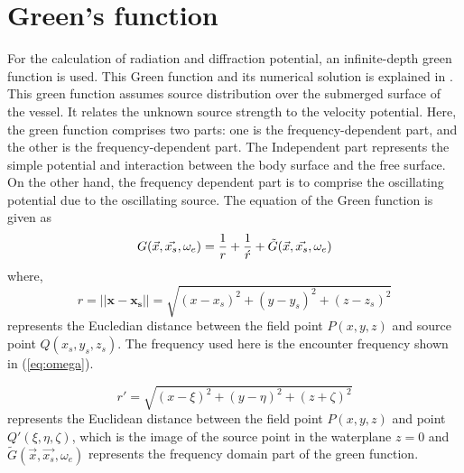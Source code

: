 \section{Green's function}
\label{sec:green_fun}
For the calculation of radiation and diffraction potential, an infinite-depth green function is 
used. This Green function and its numerical solution is explained in \cite{telste1986numerical}. 
This green function assumes source distribution over the submerged surface of the vessel. 
It relates the unknown source strength to the velocity potential. Here, the green function 
comprises two parts: one is the frequency-dependent part, and the other is the 
frequency-dependent part.  The Independent part represents the simple potential 
and interaction between the body surface and the free surface. On the other hand, 
the frequency dependent part is to comprise the oscillating potential due to the 
oscillating source. The equation of the Green function is given as 
\begin{equation}
    \label{eq:green_eq}
    G(\vec{x}, \vec{x_s}, \omega_e) = \frac{1}{r} + \frac{1}{\acute{r}} + \Tilde{G}(\vec{x}, \vec{x_s}, \omega_e) 
\end{equation}
where, 
\begin{equation}
    r = ||\boldsymbol{x} - \boldsymbol{x_s}|| = \sqrt{(x-x_s)^2+(y-y_s)^2+(z-z_s)^2}
\end{equation}
represents the Eucledian distance between the field point $P(x, y, z)$ and source 
point $Q(x_s, y_s, z_s)$. The frequency used here is the encounter frequency shown in 
(\ref{eq:omega}).

\begin{equation}
    r' = \sqrt{(x - \xi)^2 + (y - \eta)^2 + (z + \zeta)^2}   
\end{equation}
represents the Euclidean distance between the field point $P(x, y, z)$ and point 
$Q'(\xi, \eta, \zeta)$, which is the image of the source point in the waterplane 
$z=0$ and $\tilde{G}(\vec{x}, \vec{x_s}, \omega_e)$ represents the frequency domain 
part of the green function.

